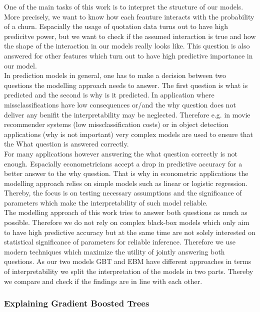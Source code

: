 \documentclass[12pt,titlepage]{article}
\begin{document}
One of the main tasks of this work is to interpret the structure of our models. More precisely, we want to know how each feauture interacts with the probability of a churn. Espacially the usage of quotation data turns out to have high predicitve power, but we want to check if the assumed interaction is true and how the shape of the interaction in our models really looks like. This question is also answered for other features which turn out to have high predictive importance in our model. \\
In prediction models in general, one has to make a decision between two questions the modelling approach needs to answer. The first question is what is predicted and the second is why is it predicted. In application where missclassifications have low consequences or/and the why question does not deliver any benifit the interpretability may be neglected. Therefore e.g. in movie recommender systems (low missclassification costs) or in object detection applications (why is not important) very complex models are used to ensure that the What question is answered correctly. \\
For many applications however answering the what question correctly is not enough. Espacially econometricians accept a drop in predictive accuracy for a better answer to the why question. That is why in econometric applications the modelling approach relies on simple models such as linear or logistic regression. Thereby, the focus is on testing necessary assumptions and the significance of parameters which make the interpretability of such model reliable. \\
The modelling approach of this work tries to answer both questions as much as possible. Therefore we do not rely on complex black-box models which only aim to have high predictive accuracy but at the same time are not solely interested on statistical significance of parameters for reliable inference. Therefore we use modern techniques which maximize the utility of jointly answering both questions. As our two models GBT and EBM have different approaches in terms of interpretability we split the interpretation of the models in two parts. Thereby we compare and check if the findings are in line with each other.\\

\subsubsection*{Explaining Gradient Boosted Trees}
\end{document}

